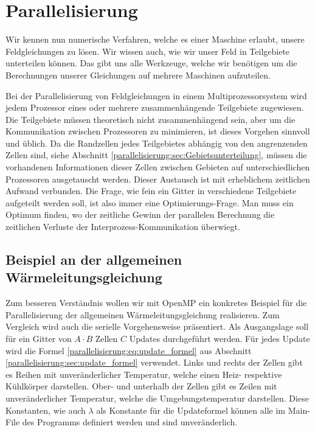 %
%
%
%
\section{Parallelisierung
	\label{parallelisierung:sec:Parallelisierung}}
Wir kennen nun numerische Verfahren, welche es einer Maschine erlaubt, unsere Feldgleichungen zu lösen.
Wir wissen auch, wie wir unser Feld in Teilgebiete unterteilen können.
Das gibt uns alle Werkzeuge, welche wir benötigen um die Berechnungen unserer Gleichungen auf mehrere Maschinen aufzuteilen.

Bei der Parallelisierung von Feldgleichungen in einem Multiprozessorsystem wird jedem Prozessor eines oder mehrere zusammenhängende Teilgebiete zugewiesen.
%
Die Teilgebiete müssen theoretisch nicht zusammenhängend sein, aber um die Kommunikation zwischen Prozessoren zu minimieren, ist dieses Vorgehen sinnvoll und üblich.
Da die Randzellen jedes Teilgebietes abhängig von den angrenzenden Zellen sind, siehe Abschnitt \ref{parallelisierung:sec:Gebietsunterteilung}, müssen die vorhandenen Informationen dieser Zellen zwischen Gebieten auf unterschiedlichen Prozessoren ausgetauscht werden.
Dieser Austausch ist mit erheblichem zeitlichen Aufwand verbunden.
Die Frage, wie fein ein Gitter in verschiedene Teilgebiete aufgeteilt werden soll, ist also immer eine Optimierungs-Frage.
Man muss ein Optimum finden, wo der zeitliche Gewinn der parallelen Berechnung die zeitlichen Verluste der Interprozess-Kommunikation überwiegt.




\subsection{Beispiel an der allgemeinen Wärmeleitungsgleichung
	\label{parallelisierung:sub:BeispielParallelisierung}}
Zum besseren Verständnis wollen wir mit OpenMP ein konkretes Beispiel für die Parallelisierung der allgemeinen Wärmeleitungsgleichung realisieren.
Zum Vergleich wird auch die serielle Vorgehensweise präsentiert.
Als Ausgangslage soll für ein Gitter von $A \cdot B$ Zellen $C$ Updates durchgeführt werden.
Für jedes Update wird die Formel \eqref{parallelisierung:eq:update_formel} aus Abschnitt \ref{parallelisierung:sec:update_formel} verwendet.
Links und rechts der Zellen gibt es Reihen mit unveränderlicher Temperatur, welche einen Heiz- respektive Kühlkörper darstellen.
%
Ober- und unterhalb der Zellen gibt es Zeilen mit unveränderlicher Temperatur, welche die Umgebungstemperatur darstellen.
Diese Konstanten, wie auch $\lambda$ als Konstante für die Updateformel können alle im Main-File des Programms definiert werden und sind unveränderlich.
%
%

